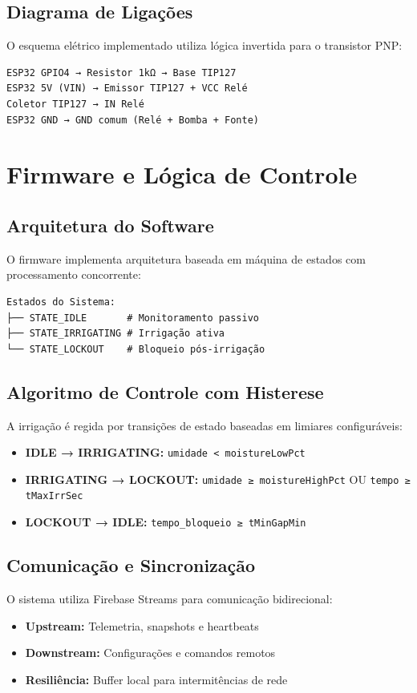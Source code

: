 \documentclass[twoside,english,brazilian]{UNISINOSmonografia}
\begin{document}
\subsection{Diagrama de Ligações}
O esquema elétrico implementado utiliza lógica invertida para o transistor PNP:

\begin{verbatim}
ESP32 GPIO4 → Resistor 1kΩ → Base TIP127
ESP32 5V (VIN) → Emissor TIP127 + VCC Relé
Coletor TIP127 → IN Relé
ESP32 GND → GND comum (Relé + Bomba + Fonte)
\end{verbatim}

\section{Firmware e Lógica de Controle}

\subsection{Arquitetura do Software}
O firmware implementa arquitetura baseada em máquina de estados com processamento concorrente:

\begin{verbatim}
Estados do Sistema:
├── STATE_IDLE       # Monitoramento passivo
├── STATE_IRRIGATING # Irrigação ativa
└── STATE_LOCKOUT    # Bloqueio pós-irrigação
\end{verbatim}

\subsection{Algoritmo de Controle com Histerese}
A irrigação é regida por transições de estado baseadas em limiares configuráveis:

\begin{itemize}
    \item \textbf{IDLE → IRRIGATING:} \texttt{umidade < moistureLowPct}
    \item \textbf{IRRIGATING → LOCKOUT:} \texttt{umidade ≥ moistureHighPct} OU \texttt{tempo ≥ tMaxIrrSec}
    \item \textbf{LOCKOUT → IDLE:} \texttt{tempo\_bloqueio ≥ tMinGapMin}
\end{itemize}

\subsection{Comunicação e Sincronização}
O sistema utiliza Firebase Streams para comunicação bidirecional:
\begin{itemize}
    \item \textbf{Upstream:} Telemetria, snapshots e heartbeats
    \item \textbf{Downstream:} Configurações e comandos remotos
    \item \textbf{Resiliência:} Buffer local para intermitências de rede
\end{itemize}
\end{document}
